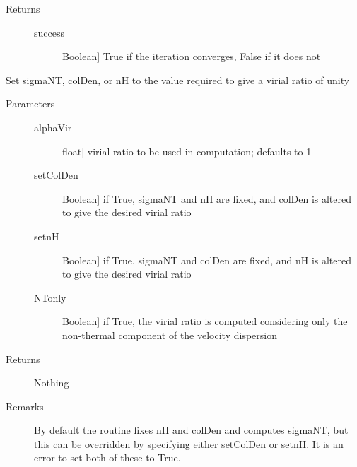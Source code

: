 \documentclass[letterpaper,10pt,english]{sphinxmanual}
\begin{document}
\begin{fulllineitems}
\begin{fulllineitems}
\begin{description}
\begin{description}
\end{description}

\item[{Returns}] \leavevmode\begin{description}
\item[{success}] \leavevmode{[}Boolean{]}
True if the iteration converges, False if it does not

\end{description}

\end{description}

\end{fulllineitems}


\begin{fulllineitems}
\label{fulldoc:despotic.cloud.setVirial}
Set sigmaNT, colDen, or nH to the value required to give a
virial ratio of unity
\begin{description}
\item[{Parameters}] \leavevmode\begin{description}
\item[{alphaVir}] \leavevmode{[}float{]}
virial ratio to be used in computation; defaults to 1

\item[{setColDen}] \leavevmode{[}Boolean{]}
if True, sigmaNT and nH are fixed, and colDen is
altered to give the desired virial ratio

\item[{setnH}] \leavevmode{[}Boolean{]}
if True, sigmaNT and colDen are fixed, and nH is altered
to give the desired virial ratio

\item[{NTonly}] \leavevmode{[}Boolean{]}
if True, the virial ratio is computed considering only the
non-thermal component of the velocity dispersion

\end{description}

\item[{Returns}] \leavevmode
Nothing

\item[{Remarks}] \leavevmode
By default the routine fixes nH and colDen and computes
sigmaNT, but this can be overridden by specifying either
setColDen or setnH. It is an error to set both of these to
True.


\end{description}
\end{fulllineitems}
\end{fulllineitems}
\end{document}
